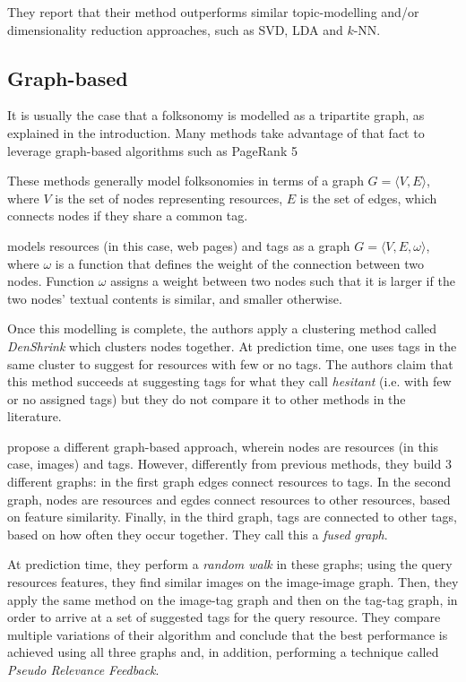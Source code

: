 They report that their method outperforms similar topic-modelling and/or dimensionality reduction approaches, such as SVD, LDA and $k$-NN.

\subsection{Graph-based}

It is usually the case that a folksonomy is modelled as a tripartite graph, as explained in the introduction. Many methods take advantage of that fact to leverage graph-based algorithms such as PageRank 5

These methods generally model folksonomies in terms of a graph $G=\langle V,E \rangle$, where $V$ is the set of nodes representing resources, $E$ is the set of edges, which connects nodes if they share a common tag.

\cite{wang_etal_2015} models resources (in this case, web pages) and tags as a graph $G=\langle V,E,\omega \rangle$, where $\omega$ is a function that defines the weight of the connection between two nodes. Function $\omega$ assigns a weight between two nodes such that it is larger if the two nodes' textual contents is similar, and smaller otherwise.

Once this modelling is complete, the authors apply a clustering method called \textit{DenShrink} \citep{huang_etal_2011} which clusters nodes together. At prediction time, one uses tags in the same cluster to suggest for resources with few or no tags. The authors claim that this method succeeds at suggesting tags for what they call \textit{hesitant} (i.e. with few or no assigned tags) but they do not compare it to other methods in the literature.

\cite{kakade_kakade_2013} propose a different graph-based approach, wherein nodes are resources (in this case, images) and tags. However, differently from previous methods, they build 3 different graphs: in the first graph edges connect resources to tags. In the second graph, nodes are resources and egdes connect resources to other resources, based on feature similarity. Finally, in the third graph, tags are connected to other tags, based on how often they occur together. They call this a \textit{fused graph}.

At prediction time, they perform a \textit{random walk} in these graphs; using the query resources features, they find similar images on the image-image graph. Then, they apply the same method on the image-tag graph and then on the tag-tag graph, in order to arrive at a set of suggested tags for the query resource. They compare multiple variations of their algorithm and conclude that the best performance is achieved using all three graphs and, in addition, performing a technique called \textit{Pseudo Relevance Feedback}.

